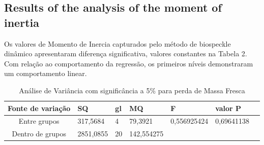 \documentclass{elsarticle}
\begin{document}
\subsection{Results of the analysis of the moment of inertia}


Os valores de Momento de Inercia capturados pelo método de biospeckle dinâmico apresentaram diferença significativa, valores constantes na Tabela 2. Com relação ao comportamento da regressão, os primeiros níveis demonstraram um comportamento linear.

\begin{table}[ht]\footnotesize
\centering
\caption{Análise de Variância com significância a 5\% para perda de Massa Fresca}
\label{anova_massa}
\begin{tabular}{|c|l|l|l|l|l|l|}
\hline
Fonte de variação & SQ       & gl & MQ         & F           & valor P                         \\ \hline
Entre grupos      & 317,5684 & 4  & 79,3921   & 0,556925424 & {\color[HTML]{FD6864} 0,69641138}\\ \hline
Dentro de grupos  & 2851,0855 & 20 & 142,554275 &             &                            \\ \hline
\end{tabular}
\end{table}
\end{document}
